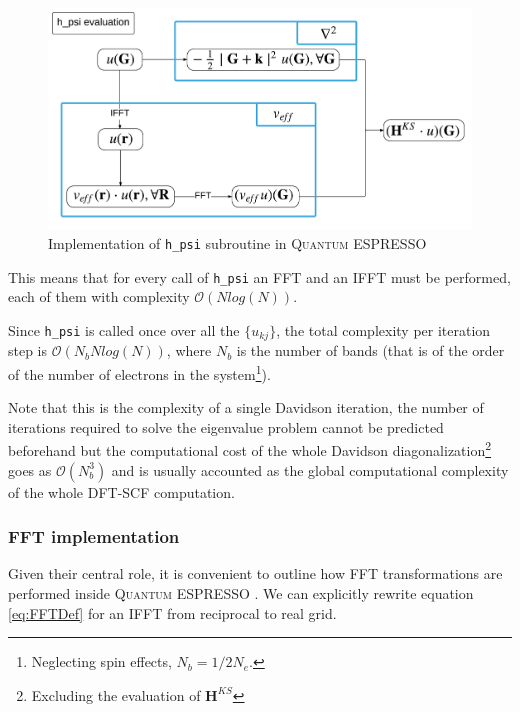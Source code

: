 \documentclass[a4paper,12pt]{article}
\newcommand\mf[1]{\mathbf{#1}}
\newcommand\QE{\textsc{Quantum} ESPRESSO }
\newcommand\bigO{\mathcal{O}}
\begin{document}
\begin{figure}[h]
\begin{center}
	\begin{framed}
	\includegraphics[width=\linewidth]{h_psi.pdf}

	\end{framed}
\caption{Implementation of \texttt{h\_psi} subroutine in \QE}
	\label{fig:hpsi}
\end{center}
\end{figure}


This means that for every call of \texttt{h\_psi} an FFT and an IFFT must be performed, each of them with complexity $\bigO(N log (N))$. 

Since \texttt{h\_psi} is called once over all the $\{u_{kj}\}$, the total complexity per iteration step is $\bigO(N_{b} N log (N))$, where $N_{b}$ is the number of bands (that is of the order of the number of electrons in the system\footnote{Neglecting spin effects, $N_b = 1/2 N_e$.}). 

Note that this is the complexity of a single Davidson iteration, the number of iterations required to solve the eigenvalue problem cannot be predicted beforehand but the computational cost of the whole Davidson diagonalization\footnote{Excluding the evaluation of $\mf{H}^{KS}$} goes as $\bigO(N_{b}^3)$ and is usually accounted as the global computational complexity of the whole DFT-SCF computation.

\subsubsection{FFT implementation}\label{sec:FFT}
Given their central role, it is convenient to outline how FFT transformations are performed inside \QE .
We can explicitly rewrite equation \eqref{eq:FFTDef} for an IFFT from reciprocal to real grid.
\end{document}
